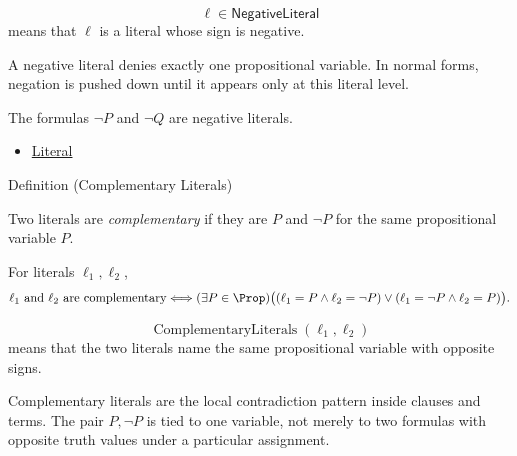 \begin{remark*}
\[
\ell\in\mathsf{NegativeLiteral}
\]
means that \(\ell\) is a literal whose sign is negative.
\end{remark*}

\begin{remark*}[Interpretation]
A negative literal denies exactly one propositional variable. In normal forms,
negation is pushed down until it appears only at this literal level.
\end{remark*}

\begin{remark*}[Examples]
The formulas \(\neg P\) and \(\neg Q\) are negative literals.
\end{remark*}

\begin{dependencies}
\begin{itemize}
  \item \hyperref[def:literal-propositional-logic]{Literal}
\end{itemize}
\end{dependencies}

\begin{definitionbox}{Definition (Complementary Literals)}
\begin{definition}
\label{def:complementary-literals-propositional-logic}
Two literals are \emph{complementary} if they are \(P\) and \(\neg P\) for the
same propositional variable \(P\).
\end{definition}
\end{definitionbox}

\begin{remark*}
For literals \(\ell_1,\ell_2\),
\[
\ell_1\text{ and }\ell_2\text{ are complementary}
\Longleftrightarrow
(\exists P\in\Prop)
\bigl((\ell_1=P\land \ell_2=\neg P)
\lor
(\ell_1=\neg P\land \ell_2=P)\bigr).
\]
\end{remark*}

\begin{remark*}
\[
\operatorname{ComplementaryLiterals}(\ell_1,\ell_2)
\]
means that the two literals name the same propositional variable with opposite
signs.
\end{remark*}

\begin{remark*}[Interpretation]
Complementary literals are the local contradiction pattern inside clauses and
terms. The pair \(P,\neg P\) is tied to one variable, not merely to two formulas
with opposite truth values under a particular assignment.
\end{remark*}

